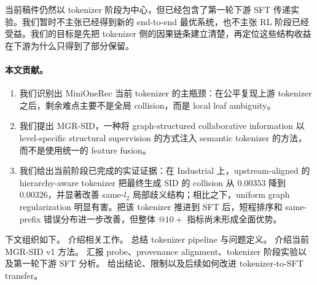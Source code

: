当前稿件仍然以 tokenizer 阶段为中心，但已经包含了第一轮下游 SFT 传递实验。我们暂时不主张已经得到新的 end-to-end 最优系统，也不主张 RL 阶段已经受益。我们的目标是先把 tokenizer 侧的因果链条建立清楚，再定位这些结构收益在下游为什么只得到了部分保留。

\paragraph{本文贡献。}
\begin{enumerate}[leftmargin=1.4em]
  \item 我们识别出 MiniOneRec 当前 tokenizer 的主瓶颈：在公平复现上游 tokenizer 之后，剩余难点主要不是全局 collision，而是 local leaf ambiguity。
  \item 我们提出 MGR-SID，一种将 graph-structured collaborative information 以 level-specific structural supervision 的方式注入 semantic tokenizer 的方法，而不是使用统一的 feature fusion。
  \item 我们给出当前阶段已完成的实证证据：在 Industrial 上，upstream-aligned 的 hierarchy-aware tokenizer 把最终生成 SID 的 collision 从 $0.00353$ 降到 $0.00326$，并显著改善 same-$l_2$ 局部歧义结构；相比之下，uniform graph regularization 明显有害。把该 tokenizer 推进到 SFT 后，短程排序和 same-prefix 错误分布进一步改善，但整体 $@10+$ 指标尚未形成全面优势。
\end{enumerate}

下文组织如下。 介绍相关工作。 总结 tokenizer pipeline 与问题定义。 介绍当前 MGR-SID v1 方法。 汇报 probe、provenance alignment、tokenizer 阶段实验以及第一轮下游 SFT 分析。 给出结论、限制以及后续如何改进 tokenizer-to-SFT transfer。
